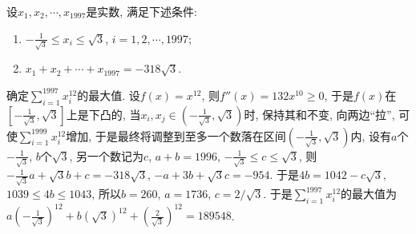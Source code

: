 \bq{}{}
设$x_{1},x_{2},\cdots,x_{1997}$是实数, 满足下述条件:
\begin{enumerate}
\item $-\frac{1}{\sqrt{3}}\le x_{i}\le\sqrt{3}$, $i=1,2,\cdots,1997$;
\item $x_{1}+x_{2}+\cdots+x_{1997}=-318\sqrt{3}$.
\end{enumerate}
确定$\sum_{i=1}^{1997}x_{i}^{12}$的最大值.
\eq
\ba
设$f(x)=x^{12}$, 则$f''(x)=132x^{10}\ge0$, 于是$f(x)$在$\left[-\frac{1}{\sqrt{3}},\sqrt{3}\right]$上是下凸的,
当$x_{i},x_{j}\in\left(-\frac{1}{\sqrt{3}},\sqrt{3}\right)$时, 保持其和不变,
向两边``拉'', 可使$\sum_{i=1}^{1999}x_{i}^{12}$增加, 于是最终将调整到至多一个数落在区间$\left(-\frac{1}{\sqrt{3}},\sqrt{3}\right)$内,
设有$a$个$-\frac{1}{\sqrt{3}}$, $b$个$\sqrt{3}$, 另一个数记为$c$, $a+b=1996$,
$-\frac{1}{\sqrt{3}}\le c\le\sqrt{3}$, 则$-\frac{1}{\sqrt{3}}a+\sqrt{3}b+c=-318\sqrt{3}$,
$-a+3b+\sqrt{3}c=-954$. 于是$4b=1042-c\sqrt{3}$, $1039\le4b\le1043$,
所以$b=260$, $a=1736$, $c=2/\sqrt{3}$. 于是$\sum_{i=1}^{1997}x_{i}^{12}$的最大值为$a\left(-\frac{1}{\sqrt{3}}\right)^{12}+b\left(\sqrt{3}\right)^{12}+\left(\frac{2}{\sqrt{3}}\right)^{12}=189548$.
\ea